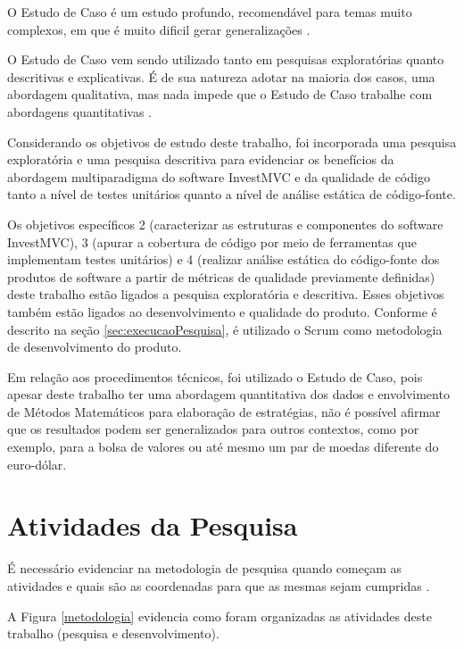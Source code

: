 O Estudo de Caso é um estudo profundo, recomendável para temas muito complexos, em que é muito dificil gerar generalizações \cite[pág.~33]{fonseca2002}.

O Estudo de Caso vem sendo utilizado tanto em pesquisas exploratórias quanto descritivas e explicativas. É de sua natureza adotar na maioria dos casos, uma abordagem qualitativa, mas nada impede que o Estudo de Caso trabalhe com abordagens quantitativas \cite[pág.~22]{yin}.

Considerando os objetivos de estudo deste trabalho, foi incorporada uma pesquisa exploratória e uma pesquisa descritiva para evidenciar os benefícios da abordagem multiparadigma do software InvestMVC e da qualidade de código tanto a nível de testes unitários quanto a nível de análise estática de código-fonte.

Os objetivos específicos 2 (caracterizar as estruturas e componentes do software InvestMVC), 3 (apurar a cobertura de código por meio de ferramentas que implementam testes unitários) e 4 (realizar análise estática do código-fonte dos produtos de software a partir de métricas de qualidade previamente definidas) deste trabalho estão ligados a pesquisa exploratória e descritiva. Esses objetivos também estão ligados ao desenvolvimento e qualidade do produto. Conforme é descrito na seção \ref{sec:execucaoPesquisa}, é utilizado o Scrum como metodologia de desenvolvimento do produto.

Em relação aos procedimentos técnicos, foi utilizado o Estudo de Caso, pois apesar deste trabalho ter uma abordagem quantitativa dos dados e envolvimento de Métodos Matemáticos para elaboração de estratégias, não é possível afirmar que os resultados podem ser generalizados para outros contextos, como por exemplo, para a bolsa de valores ou até mesmo um par de moedas diferente do euro-dólar.

\section{Atividades da Pesquisa}

É necessário evidenciar na metodologia de pesquisa quando começam as atividades e quais são as coordenadas para que as mesmas sejam cumpridas \cite{forcon2014}.

A Figura \ref{metodologia} evidencia como foram organizadas as atividades deste trabalho (pesquisa e desenvolvimento).

